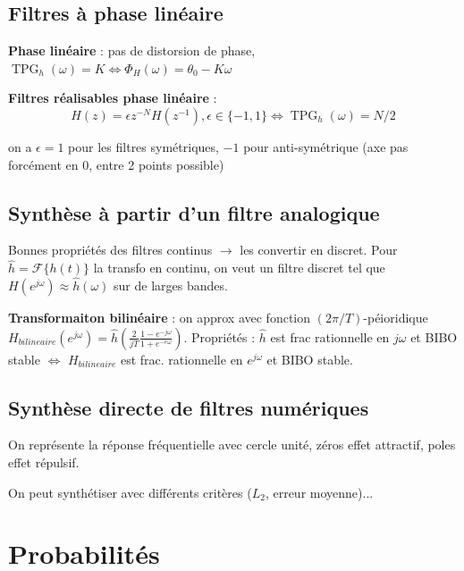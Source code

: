 \subsection*{Filtres à phase linéaire} \label{phase_lineaire}

\textbf{Phase linéaire} : pas de distorsion de phase, $\operatorname{TPG}_h(\omega) = K \Leftrightarrow \Phi_H(\omega) = \theta_0 - K\omega$

\textbf{Filtres réalisables phase linéaire} : 
\begin{equation*}
    H(z) = \epsilon z^{-N} H(z^{-1}), \epsilon \in \{-1,1\} \Leftrightarrow \operatorname{TPG}_h(\omega) = N/2
\end{equation*}

on a $\epsilon = 1$ pour les filtres symétriques, $-1$ pour anti-symétrique (axe pas forcément en 0, entre 2 points possible)

\subsection*{Synthèse à partir d'un filtre analogique}

Bonnes propriétés des filtres continus $\rightarrow$ les convertir en discret. Pour $\hat h = \mathcal{F}\{h(t)\}$ la transfo en continu, on veut un filtre discret tel que $H(e^{j\omega}) \approx \hat h(\omega)$ sur de larges bandes.

\textbf{Transformaiton bilinéaire} : on approx avec fonction $(2\pi/T)$-péioridique $H_{bilineaire}(e^{j\omega}) = \hat h\left(\frac{2}{jT}\frac{1-e^{-j\omega}}{1+e^{-e\omega}}\right)$. Propriétés : $\hat h$ est frac rationnelle en $j\omega$ et BIBO stable $\Leftrightarrow$ $H_{bilineaire}$ est frac. rationnelle en $e^{j\omega}$ et BIBO stable.

\subsection*{Synthèse directe de filtres numériques}

On représente la réponse fréquentielle avec cercle unité, zéros effet attractif, poles effet répulsif.

On peut synthétiser avec différents critères ($L_2$, erreur moyenne)...


\section{Probabilités}

